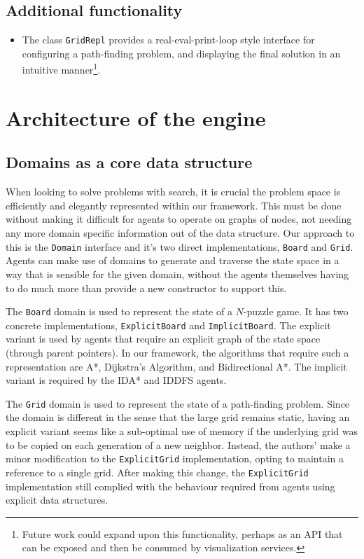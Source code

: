 \documentclass{article}
\begin{document}
\subsection{Additional functionality}
\begin{itemize}
    \item The class \texttt{GridRepl} provides a real-eval-print-loop style interface for configuring a path-finding problem, and displaying the final solution in an intuitive manner\footnote{Future work could expand upon this functionality, perhaps as an API that can be exposed and then be consumed by visualization services.}.
\end{itemize}

\section{Architecture of the engine}
\subsection{Domains as a core data structure}
When looking to solve problems with search, it is crucial the problem space is efficiently and elegantly represented within our framework. This must be done without making it difficult for agents to operate on graphs of nodes, not needing any more domain specific information out of the data structure. Our approach to this is the \texttt{Domain} interface and it's two direct implementations, \texttt{Board} and \texttt{Grid}. Agents can make use of domains to generate and traverse the state space in a way that is sensible for the given domain, without the agents themselves having to do much more than provide a new constructor to support this.

The \texttt{Board} domain is used to represent the state of a $N$-puzzle game. It has two concrete implementations, \texttt{ExplicitBoard} and \texttt{ImplicitBoard}. The explicit variant is used by agents that require an explicit graph of the state space (through parent pointers). In our framework, the algorithms that require such a representation are A*, Dijkstra's Algorithm, and Bidirectional A*. The implicit variant is required by the IDA* and IDDFS agents.

The \texttt{Grid} domain is used to represent the state of a path-finding problem. Since the domain is different in the sense that the large grid remains static, having an explicit variant seems like a sub-optimal use of memory if the underlying grid was to be copied on each generation of a new neighbor. Instead, the authors' make a minor modification to the \texttt{ExplicitGrid} implementation, opting to maintain a reference to a single grid. After making this change, the \texttt{ExplicitGrid} implementation still complied with the behaviour required from agents using explicit data structures. 
\end{document}
